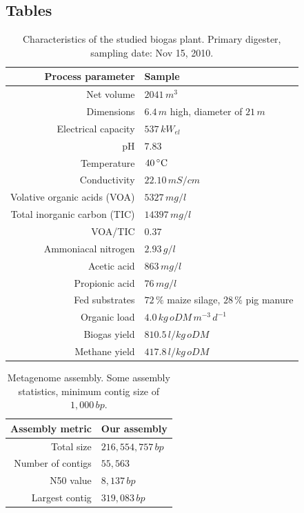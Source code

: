 \documentclass{bmcart}
\begin{document}
\begin{backmatter}

\newpage
\section*{Tables}
\begin{table}[h!]
\caption{Characteristics of the studied biogas plant. Primary digester, sampling date: Nov 15, 2010.}
\begin{tabular}{rl}
\hline
Process parameter & Sample\\
\hline
Net volume & $2041\,m^{3}$\\
Dimensions & $6.4\,m$ high, diameter of $21\,m$\\
Electrical capacity & $537\,kW_{el}$\\
\hline
pH & $7.83$\\
Temperature & $40\,^{\circ}{\rm C}$\\
Conductivity & $22.10\,mS/cm$\\
Volative organic acids (VOA) & $5327\,mg/l$\\
Total inorganic carbon (TIC) & $14397\,mg/l$\\
VOA/TIC & $0.37$\\
Ammoniacal nitrogen & $2.93\,g/l$\\
Acetic acid & $863\,mg/l$\\
Propionic acid & $76\,mg/l$\\
\hline
Fed substrates & $72\,\%$ maize silage, $28\,\%$ pig manure\\
Organic load & $4.0\,kg\,oDM\,m^{-3}\,d^{-1}$\\
Biogas yield & $810.5\,l/kg\,oDM$\\
Methane yield & $417.8\,l/kg\,oDM$\\
\hline
\end{tabular}
\label{tBiogasPlant}
\end{table}

\begin{table}[h!]
\caption{Metagenome assembly. Some assembly statistics, minimum contig size of $1,000\,bp$.}
\begin{tabular}{rl}
\hline
Assembly metric & Our assembly\\
\hline
Total size & $216,554,757\,bp$\\
Number of contigs & $55,563$\\
N50 value & $8,137\,bp$\\
Largest contig & $319,083\,bp$\\
\hline
\end{tabular}
\label{tAssembly}
\end{table}


\end{backmatter}
\end{document}
